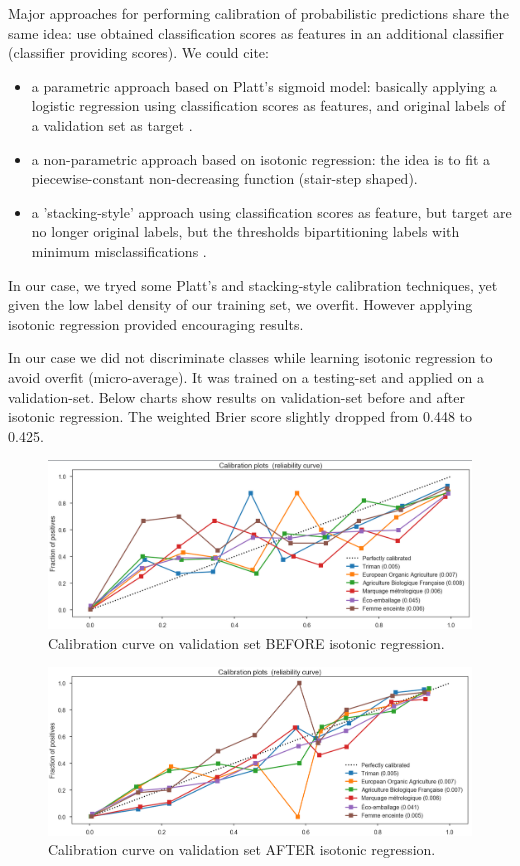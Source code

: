 Major approaches for performing calibration of probabilistic predictions share the same idea: use obtained classification scores as features in an additional classifier (classifier providing scores). We could cite: 
\begin{itemize}
	\item a parametric approach based on Platt’s sigmoid model: basically applying a logistic regression using classification scores as features, and original labels of a validation set as target \cite{Calibration}.
	\item a non-parametric approach based on isotonic regression: the idea is to fit a piecewise-constant non-decreasing function (stair-step shaped).
	\item a 'stacking-style' approach using classification scores as feature, but target are no longer original labels, but the thresholds bipartitioning labels with minimum misclassifications \cite{MultilabelReview}.
\end{itemize}

In our case, we tryed some Platt's and stacking-style calibration techniques, yet given the low label density of our training set, we overfit. However applying isotonic regression provided encouraging results. 

In our case we did not discriminate classes while learning isotonic regression to avoid overfit (micro-average). It was trained on a testing-set and applied on a validation-set. Below charts show results on validation-set before and after isotonic regression. The weighted Brier score slightly dropped from 0.448 to 0.425.

\begin{figure}[H]
\centering
\includegraphics[scale=0.40]{./images/calibration/calibration_val_before.png}
\caption{Calibration curve on validation set BEFORE isotonic regression.}
\end{figure}

\begin{figure}[H]
\centering
\includegraphics[scale=0.40]{./images/calibration/calibration_val_after.png}
\caption{Calibration curve on validation set AFTER isotonic regression.}
\end{figure}


